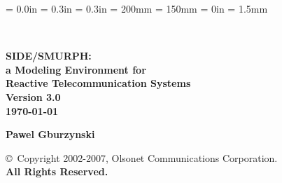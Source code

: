 \newcommand{\references}[1]{%
}%

\newenvironment{doublespace}%
{\renewcommand{\baselinestretch}{1.50} \large \normalsize}%
{\renewcommand{\baselinestretch}{1} \large \normalsize}%

\newenvironment{singlespace}%
{\renewcommand{\baselinestretch}{1} \large \normalsize}%
{\renewcommand{\baselinestretch}{1.50} \large \normalsize}%

\newcommand{\lansf}{{\sc LANSF}}
\newcommand{\smurph}{{\sc SIDE}}
\newcommand{\dsd}{{\sc DSD}}
\newcommand{\smurphtt}{{\tt SIDE}}
\newcommand{\smurphrm}{{SIDE}}
\newcommand{\smurphtts}{{\tt side}}
\newcommand{\serdel}{{\sc SERDEL}}
\newcommand{\djgpp}{{\sc DJGPP}}

\topmargin = 0.0in
\oddsidemargin = 0.3in
\evensidemargin = 0.3in
\textheight = 200mm
\textwidth = 150mm
\parindent = 0in
\parskip = 1.5mm

\sloppy



\begin{titlepage}

\vspace*{0.35in}

\begin{center}

 \\

\vspace*{0.45in}

\Huge\bf SIDE/SMURPH:\vspace{0.1in} \\

\huge\bf a Modeling Environment for\vspace{0.1in} \\

Reactive Telecommunication Systems\vspace{0.25in}\\

\Large Version 3.0 \\

\large {\today} \\

\vspace{1.1in}

\bf Pawel Gburzynski \\

\vspace*{1.5in}

{\Large {\copyright}~Copyright 2002-2007, Olsonet Communications Corporation.\\
{\bf All Rights Reserved.}}

\normalsize

\end{center}

\end{titlepage}

